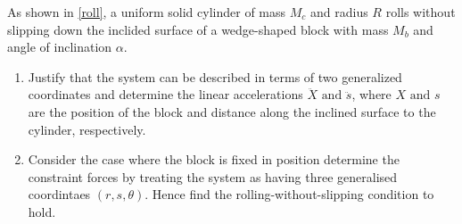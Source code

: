 \documentclass[a4paper,12pt]{report}
\begin{document}
{As shown in \cref{roll}, a uniform solid cylinder of mass \(M_{c} \) and radius \(R\)  rolls without slipping down the inclided surface of a wedge-shaped block with mass \(M_{b} \) and angle of inclination \(\alpha \). 

\begin{enumerate}
	\item Justify that the system can be described in terms of two generalized coordinates and determine the linear accelerations \(\ddot{X} \text { and } \ddot{s}  \), where \(X \text { and } s\) are the position of the block and distance along the inclined surface to the cylinder, respectively.       
	\item Consider the case where the block is fixed in position determine the constraint forces by treating the system as having three generalised coordintaes \((r,s,\theta )\). Hence find the rolling-without-slipping condition to hold.
\end{enumerate}
~
}
\end{document}
